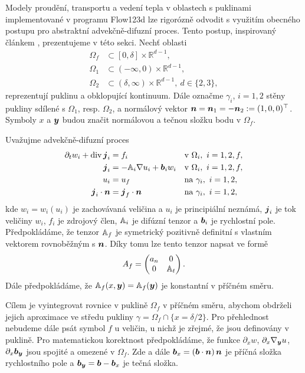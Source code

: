 \def\d{\mathrm{d}}
\def\prtl{\partial}
\def\Real{\mathbb R}


Modely proudění, transportu a vedení tepla v oblastech s puklinami implementované v programu Flow123d lze rigorózně odvodit s využitím obecného postupu pro abstraktní advekčně-difuzní proces.
Tento postup, inspirovaný článkem \cite{martin_modeling_2005}, prezentujeme v této sekci.
Nechť oblasti
\begin{align*}
 \Omega_f &\subset [0,\delta] \times \Real^{d-1},\\
 \Omega_1 &\subset (-\infty,0)\times \Real^{d-1},\\
 \Omega_2 &\subset (\delta,\infty)\times \Real^{d-1},~d\in\{2,3\},
\end{align*}
reprezentují puklinu a obklopující kontinuum.
Dále označme $\gamma_i$, $i=1,2$ stěny pukliny sdílené s $\Omega_1$, resp. $\Omega_2$,
a normálový vektor $\mathbf{\boldsymbol{n}}=\mathbf{\boldsymbol{n}}_1=-\mathbf{\boldsymbol{n}}_2:=(1,0,0)^\top$.
Symboly $x$ a $\mathbf{\boldsymbol{y}}$ budou značit normálovou a tečnou složku bodu v $\Omega_f$. 

Uvažujme advekčně-difuzní proces
\begin{align}
  \label{eq:fr:continuity}
  \prtl_t w_i + \div \vc j_i &= f_i&&  \text{v } \Omega_i,\ i=1,2,f,\\
  \label{eq:fr:flux}
  \vc j_i &= - \tn A_i\grad u_i + \vc b_i w_i&& \text{v } \Omega_i,\ i=1,2,f,\\
  \label{eq:fr:Dirichlet}
  u_i &= u_f&& \text{na } \gamma_i,\ i=1,2,\\
  \label{eq:fr:Neumann}
  \vc j_i \cdot \vc n &= \vc j_f \cdot \vc n&& \text{na } \gamma_i,\ i=1,2,
\end{align}
kde $w_i=w_i(u_i)$ je zachovávaná veličina a $u_i$ je principiální neznámá, $\mathbf{\boldsymbol{j}}_i$ je tok veličiny $w_i$, $f_i$ je zdrojový člen,
${\mathbb{A}}_i$ je difúzní tenzor a $\mathbf{\boldsymbol{b}}_i$ je rychlostní pole.
Předpokládáme, že tenzor ${\mathbb{A}}_f$ je symetrický pozitivně definitní 
s vlastním vektorem rovnoběžným s $\mathbf{\boldsymbol{n}}$.
Díky tomu lze tento tenzor napsat ve formě
\[
 A_f = \begin{pmatrix} 
            a_n & 0  \\
            0 & {\mathbb{A}}_t
       \end{pmatrix}.
\]
Dále předpokládáme, že ${\mathbb{A}}_f(x, \mathbf{\boldsymbol{y}})={\mathbb{A}}_f(\mathbf{\boldsymbol{y}})$ je konstantní v příčném směru.

Cílem je vyintegrovat rovnice v puklině $\Omega_f$ v příčném směru, abychom obdrželi jejich aproximace ve středu pukliny $\gamma=\Omega_f \cap \{x=\delta/2\}$. 
Pro přehlednost nebudeme dále psát symbol $f$ u veličin, u nichž je zřejmé, že jsou definovány v puklině. 
Pro matematickou korektnost předpokládáme, že funkce
$\prtl_x w$, $\prtl_x \grad_{\vc y} u$, $\prtl_x \vc b_{\vc y}$ jsou spojité a omezené v $\Omega_f$. Zde a dále
$\mathbf{\boldsymbol{b}}_x=(\mathbf{\boldsymbol{b}} \cdot \mathbf{\boldsymbol{n}})\, \mathbf{\boldsymbol{n}}$ je příčná složka rychlostního pole a $\mathbf{\boldsymbol{b}}_{\mathbf{\boldsymbol{y}}} = \mathbf{\boldsymbol{b}} - \mathbf{\boldsymbol{b}}_x$ je tečná složka.


